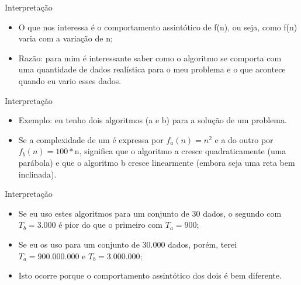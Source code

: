 \documentclass[12pt,table,xcolor={dvipsnames}]{beamer}
\begin{document}
\begin{frame}[fragile]{Interpretação}
\begin{itemize}
\item O que nos interessa é o comportamento assintótico de f(n), ou seja, como f(n) varia com a variação de n;
\item Razão: para mim é interessante saber como o algoritmo se comporta com uma quantidade de dados realística para o meu problema e o que acontece quando eu vario esses dados.
\end{itemize}
\end{frame}

\begin{frame}[fragile]{Interpretação}
\begin{itemize}
\item Exemplo: eu tenho dois algoritmos (a e b) para a solução de um problema. 
\item Se a complexidade de um é expressa por $f_a(n) = n^{2}$ e a do outro por $f_b(n) = 100*$n, significa que o algoritmo a cresce quadraticamente (uma parábola) e que o algoritmo b cresce linearmente (embora seja uma reta bem inclinada).
\end{itemize}
\end{frame}

\begin{frame}[fragile]{Interpretação}
\begin{itemize}
\item Se eu uso estes algoritmos para um conjunto de 30 dados, o segundo com $T_b=3.000$ é pior do que o primeiro com $T_a=900$;
\item Se eu os uso para um conjunto de 30.000 dados, porém, terei $T_a=900.000.000$ e $T_b=3.000.000$;
\item Isto ocorre porque o comportamento assintótico dos dois é bem diferente.
\end{itemize}
\end{frame}
\end{document}
